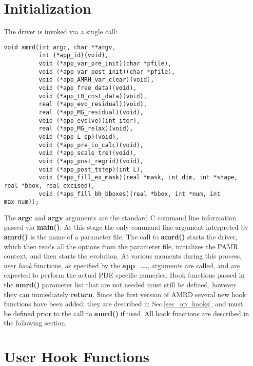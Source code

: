 \documentclass[aps,amssymb,unsortedaddress,nofootinbib]{revtex4}
\begin{document}

\section{Initialization}\label{sec_init}

The driver is invoked via a single call:

\begin{verbatim}
void amrd(int argc, char **argv,
          int (*app_id)(void),
          void (*app_var_pre_init)(char *pfile),
          void (*app_var_post_init)(char *pfile),
          void (*app_AMRH_var_clear)(void),
          void (*app_free_data)(void),
          void (*app_t0_cnst_data)(void),
          real (*app_evo_residual)(void),
          real (*app_MG_residual)(void),
          void (*app_evolve)(int iter),
          real (*app_MG_relax)(void),
          void (*app_L_op)(void),
          void (*app_pre_io_calc)(void),
          void (*app_scale_tre)(void),
          void (*app_post_regrid)(void),
          void (*app_post_tstep)(int L),
          void (*app_fill_ex_mask)(real *mask, int dim, int *shape, real *bbox, real excised),
          void (*app_fill_bh_bboxes)(real *bbox, int *num, int max_num));
\end{verbatim}

The {\bf argc} and {\bf argv} arguments are the standard C command line information
passed via {\bf main()}. At this stage the only command line argument interpreted by 
{\bf amrd()} is the name of a parameter file. The call to {\bf amrd()} starts the driver,
which then reads all the options from the parameter file, initializes the PAMR context,
and then starts the evolution. At various moments during this process, user {\em hook}
functions, as specified by the {\bf app\_...}, arguments are called, and are expected
to perform the actual PDE specific numerics. Hook functions passed in the {\bf amrd()} 
parameter list that are not needed
must still be defined, however they can immediately {\bf return}. Since the first
version of AMRD several new hook functions have been added; they are
described in Sec.\ref{sec_op_hooks}, and must be defined prior to the call to
{\bf amrd()} if used.
All hook functions are described in the following section.

\section{User Hook Functions}\label{sec_hook}
\end{document}
